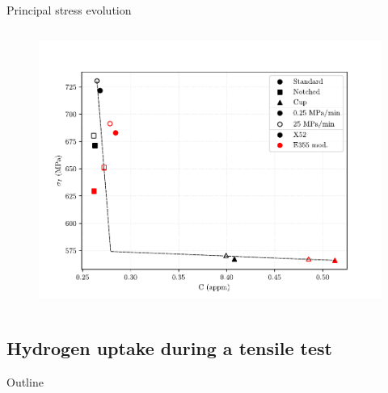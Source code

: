 \documentclass[9pt]{beamer}
\begin{document}
\begin{frame}{Principal stress evolution}
\begin{columns}
\begin{column}{0.49\textwidth}
	\begin{figure}
		\centering
		\includegraphics[width=\textwidth]{Images/plot_sigp1_C_edit.pdf} \\
	\end{figure}
\end{column}

\end{columns}

\end{frame}


\subsection{Hydrogen uptake during a tensile test}

\begin{frame}{Outline}
	\tableofcontents[ 
    currentsubsection, 
    hideothersubsections, 
    sectionstyle=show/shaded, 
    subsectionstyle=show/shaded, 
    ] 
\end{frame}

\end{document}
